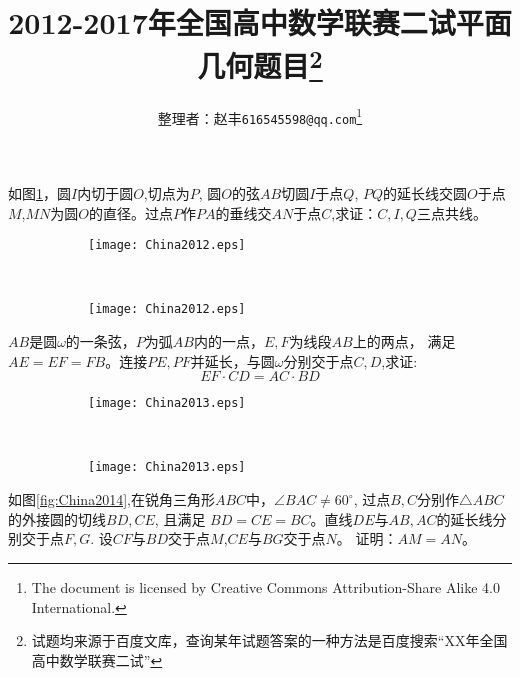 \documentclass{article}
\begin{document}
\title{2012-2017年全国高中数学联赛二试平面几何题目\footnote{试题均来源于百度文库，查询某年试题答案的一种方法是百度搜索“XX年全国高中数学联赛二试”}}
\author{整理者：赵丰\footnotesize \texttt{616545598@qq.com}\footnote{The document is licensed by Creative Commons Attribution-Share Alike 4.0 International.}}
\maketitle
\begin{Exercise}[title = {2012年，30分}]
如图\ref{fig:p4}，圆$I$内切于圆$O$,切点为$P$, 圆$O$的弦$AB$切圆$I$于点$Q$,
$PQ$的延长线交圆$O$于点$M$,$MN$为圆$O$的直径。过点$P$作$PA$的垂线交$AN$于点$C$,求证：$C,I,Q$三点共线。
 \end{Exercise}
 
\begin{figure}[!ht]
    \centering
    \begin{subfigure}[b]{0.45\textwidth}
	\texttt{[image: China2012.eps]}
	\caption{}\label{fig:p4}
    \end{subfigure}~
    \begin{subfigure}[b]{0.45\textwidth}
	\texttt{[image: China2012.eps]}
	\caption{}
    \end{subfigure}
    \caption{}
\end{figure}

\begin{Exercise}[title = {2013年，30分}]
$AB$是圆$\omega$的一条弦，$P$为弧$AB$内的一点，$E,F$为线段$AB$上的两点，
满足$AE=EF=FB$。连接$PE,PF$并延长，与圆$\omega$分别交于点$C,D$,求证:
\[
EF\cdot CD = AC\cdot BD
\]
\end{Exercise}

\begin{figure}[!ht]
    \centering
    \begin{subfigure}[b]{0.45\textwidth}
    	\texttt{[image: China2013.eps]}
    	\caption{}\label{fig:p5}
    \end{subfigure}~
    \begin{subfigure}[b]{0.45\textwidth}
    	\texttt{[image: China2013.eps]}
    	\caption{}
    \end{subfigure}
    \caption{}
\end{figure}
   
\begin{Exercise}[title = {2014年，40分}]
如图\ref{fig:China2014},在锐角三角形$ABC$中，$\angle BAC \neq 60^{\circ}$, 过点$B,C$分别作$\triangle ABC$的外接圆的切线$BD,CE$, 且满足 $BD=CE=BC$。直线$DE$与$AB,AC$的延长线分别交于点$F,G$. 设$CF$与$BD$交于点$M$,$CE$与$BG$交于点$N$。 证明：$AM=AN$。
\end{Exercise}
\end{document}
